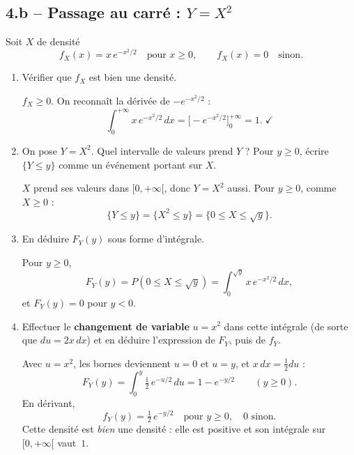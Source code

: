\subsection*{4.b -- Passage au carré : $Y=X^2$}

Soit $X$ de densité
\[
  f_X(x)=x\,e^{-x^2/2}\quad\text{pour }x\ge 0,\qquad
  f_X(x)=0\quad\text{sinon.}
\]

\begin{enumerate}
  \item Vérifier que $f_X$ est bien une densité.
  \begin{solution}
    $f_X\ge 0$. On reconnaît la dérivée de $-e^{-x^2/2}$ :
    \[
      \int_0^{+\infty}x\,e^{-x^2/2}\,dx
      =\bigl[-e^{-x^2/2}\bigr]_0^{+\infty}=1.\;\checkmark
    \]
  \end{solution}

  \item On pose $Y=X^2$. Quel intervalle de valeurs prend $Y$ ?
  Pour $y\ge 0$, écrire $\{Y\le y\}$ comme un événement portant
  sur $X$.
  \begin{solution}
    $X$ prend ses valeurs dans $[0,+\infty[$, donc $Y=X^2$ aussi.
    Pour $y\ge 0$, comme $X\ge 0$ :
    \[
      \{Y\le y\}=\{X^2\le y\}=\{0\le X\le\sqrt{y}\}.
    \]
  \end{solution}

  \item En déduire $F_Y(y)$ sous forme d'intégrale.
  \begin{solution}
    Pour $y\ge 0$,
    \[
      F_Y(y)=P(0\le X\le\sqrt{y})
      =\int_0^{\sqrt{y}}x\,e^{-x^2/2}\,dx,
    \]
    et $F_Y(y)=0$ pour $y<0$.
  \end{solution}

  \item Effectuer le \textbf{changement de variable} $u=x^2$
  dans cette intégrale (de sorte que $du=2x\,dx$) et en déduire
  l'expression de $F_Y$, puis de $f_Y$.
  \begin{solution}
    Avec $u=x^2$, les bornes deviennent $u=0$ et $u=y$, et
    $x\,dx=\tfrac{1}{2}du$ :
    \[
      F_Y(y)=\int_0^{y}\tfrac{1}{2}\,e^{-u/2}\,du
      =1-e^{-y/2}\qquad(y\ge 0).
    \]
    En dérivant,
    \[
      \boxed{\,f_Y(y)=\tfrac{1}{2}\,e^{-y/2}\quad\text{pour }y\ge 0,\quad
      0\text{ sinon.}\,}
    \]
    Cette densité est \emph{bien} une densité : elle est positive
    et son intégrale sur $[0,+\infty[$ vaut~$1$.
  \end{solution}


\end{enumerate}
